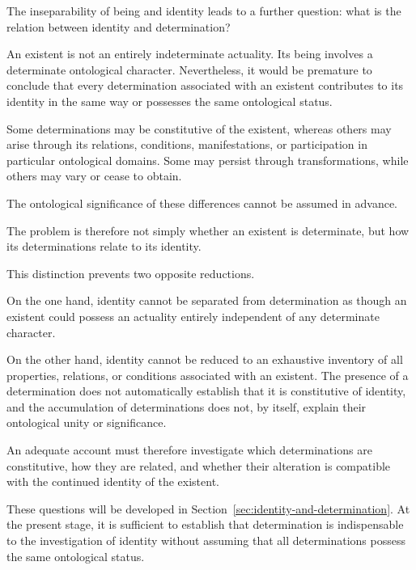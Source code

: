 The inseparability of being and identity
leads to a further question: what is the
relation between identity and determination?

An existent is not an entirely indeterminate
actuality. Its being involves a determinate
ontological character. Nevertheless, it would
be premature to conclude that every determination
associated with an existent contributes to
its identity in the same way or possesses
the same ontological status.

Some determinations may be constitutive of
the existent, whereas others may arise through
its relations, conditions, manifestations,
or participation in particular ontological
domains. Some may persist through transformations,
while others may vary or cease to obtain.

The ontological significance of these differences
cannot be assumed in advance.

The problem is therefore not simply whether
an existent is determinate, but how its
determinations relate to its identity.

This distinction prevents two opposite reductions.

On the one hand, identity cannot be separated
from determination as though an existent could
possess an actuality entirely independent of
any determinate character.

On the other hand, identity cannot be reduced
to an exhaustive inventory of all properties,
relations, or conditions associated with
an existent. The presence of a determination
does not automatically establish that it is
constitutive of identity, and the accumulation
of determinations does not, by itself,
explain their ontological unity or significance.

An adequate account must therefore investigate
which determinations are constitutive, how
they are related, and whether their alteration
is compatible with the continued identity
of the existent.

These questions will be developed in
Section~\ref{sec:identity-and-determination}.
At the present stage, it is sufficient to
establish that determination is indispensable
to the investigation of identity without
assuming that all determinations possess
the same ontological status.



